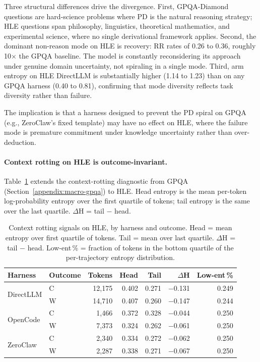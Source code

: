 Three structural differences drive the divergence.
First, GPQA-Diamond questions are hard-science problems where PD is the natural
reasoning strategy; HLE questions span philosophy, linguistics, theoretical
mathematics, and experimental science, where no single derivational framework
applies.
Second, the dominant non-reason mode on HLE is recovery: RR rates of 0.26 to
0.36, roughly 10$\times$ the GPQA baseline.
The model is constantly reconsidering its approach under genuine domain
uncertainty, not spiraling in a single mode.
Third, arm entropy on HLE DirectLLM is substantially higher (1.14 to 1.23) than
on any GPQA harness (0.40 to 0.81), confirming that mode diversity reflects
task diversity rather than failure.

The implication is that a harness designed to prevent the PD spiral on GPQA
(e.g., ZeroClaw's fixed template) may have no effect on HLE, where the failure
mode is premature commitment under knowledge uncertainty rather than
over-deduction.

\paragraph{Context rotting on HLE is outcome-invariant.}

Table~\ref{tab:hle-context-rotting} extends the context-rotting diagnostic from
GPQA (Section~\ref{appendix:macro-gpqa}) to HLE.
Head entropy is the mean per-token log-probability entropy over the first
quartile of tokens; tail entropy is the same over the last quartile.
$\Delta$H = tail $-$ head.

\begin{table}[t]
\centering
\small
\caption{%
  Context rotting signals on HLE, by harness and outcome.
  Head = mean entropy over first quartile of tokens.
  Tail = mean over last quartile.
  $\Delta$H = tail $-$ head.
  Low-ent\,\% = fraction of tokens in the bottom quartile of the per-trajectory
  entropy distribution.
}
\label{tab:hle-context-rotting}
\setlength{\tabcolsep}{3pt}
\begin{tabular}{llrrrrr}
\toprule
Harness & Outcome & Tokens & Head & Tail & $\Delta$H & Low-ent\,\% \\
\midrule
\multirow{2}{*}{DirectLLM}
  & C & 12{,}175 & 0.402 & 0.271 & $-$0.131 & 0.249 \\
  & W & 14{,}710 & 0.407 & 0.260 & $-$0.147 & 0.244 \\
\midrule
\multirow{2}{*}{OpenCode}
  & C &  1{,}466 & 0.372 & 0.328 & $-$0.044 & 0.250 \\
  & W &  7{,}373 & 0.324 & 0.262 & $-$0.061 & 0.250 \\
\midrule
\multirow{2}{*}{ZeroClaw}
  & C &  2{,}340 & 0.334 & 0.272 & $-$0.062 & 0.250 \\
  & W &  2{,}287 & 0.338 & 0.271 & $-$0.067 & 0.250 \\
\bottomrule
\end{tabular}
\end{table}

